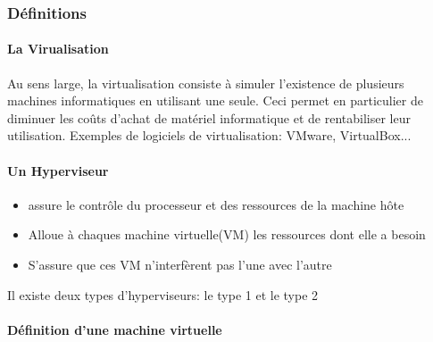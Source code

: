 \subsubsection{Définitions}

\paragraph{La Virualisation}
 Au sens large, la virtualisation consiste à simuler l'existence de plusieurs machines informatiques en utilisant une seule. Ceci permet en particulier de diminuer les coûts d'achat de matériel informatique et de rentabiliser leur utilisation.
Exemples de logiciels de virtualisation: VMware, VirtualBox...

\paragraph{Un Hyperviseur}
\begin{itemize}
	\item assure le contrôle du processeur et des ressources de la machine hôte
	\item Alloue à chaques machine virtuelle(VM) les ressources dont elle a besoin
	\item S'assure que ces VM n'interfèrent pas l'une avec l'autre
\end{itemize}

Il existe deux types d'hyperviseurs: le type 1 et le type 2

\paragraph{Définition d'une machine virtuelle}

